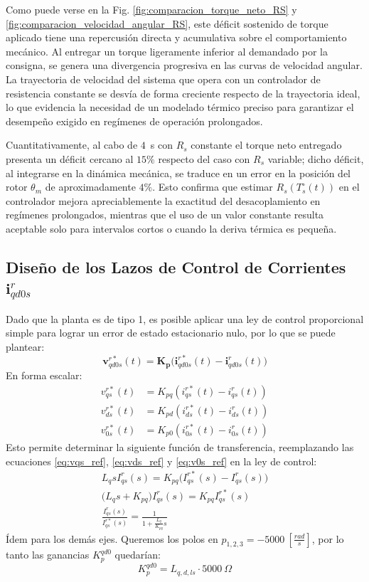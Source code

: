 \documentclass[12pt, a4paper,journal, onecolumn, compsoc]{IEEEtran}
\begin{document}
Como puede verse en la Fig. \ref{fig:comparacion_torque_neto_RS} y \ref{fig:comparacion_velocidad_angular_RS}, este déficit sostenido de torque aplicado tiene una repercusión directa y acumulativa sobre el comportamiento mecánico. Al entregar un torque ligeramente inferior al demandado por la consigna, se genera una divergencia progresiva en las curvas de velocidad angular. La trayectoria de velocidad del sistema que opera con un controlador de resistencia constante se desvía de forma creciente respecto de la trayectoria ideal, lo que evidencia la necesidad de un modelado térmico preciso para garantizar el desempeño exigido en regímenes de operación prolongados.

Cuantitativamente, al cabo de $4$~s con $R_s$ constante el torque neto entregado presenta un déficit cercano al $15\%$ respecto del caso con $R_s$ variable; dicho déficit, al integrarse en la dinámica mecánica, se traduce en un error en la posición del rotor $\theta_m$ de aproximadamente $4\%$. Esto confirma que estimar $R_s(T_s^\circ(t))$ en el controlador mejora apreciablemente la exactitud del desacoplamiento en regímenes prolongados, mientras que el uso de un valor constante resulta aceptable solo para intervalos cortos o cuando la deriva térmica es pequeña.
\subsection{Diseño de los Lazos de Control de Corrientes $\bm{i}_{qd0s}^r$}
Dado que la planta es de tipo 1, es posible aplicar una ley de control proporcional simple para lograr un error de estado estacionario nulo, por lo que se puede plantear:
\begin{equation}
    \bm{v}_{qd0s}^{r*}(t) = \bm{K_p} \big(\bm{i}_{qd0s}^{r*}(t)-\bm{i}_{qd0s}^{r}(t)\big)
\end{equation}
En forma escalar:
\begin{equation*}
\begin{aligned}
v_{qs}^{r*}(t) &= K_{pq} \left(i_{qs}^{r*}(t) - i_{qs}^{r}(t)\right) \\
v_{ds}^{r*}(t) &= K_{pd} \left(i_{ds}^{r*}(t) - i_{ds}^{r}(t)\right) \\
v_{0s}^{r*}(t) &= K_{p0} \left(i_{0s}^{r*}(t) - i_{0s}^{r}(t)\right)
\end{aligned}
\end{equation*}
Esto permite determinar la siguiente función de transferencia, reemplazando las ecuaciones \eqref{eq:vqs_ref}, \eqref{eq:vds_ref} y \eqref{eq:v0s_ref} en la ley de control:
\begin{gather*}
    L_qsI_{qs}^r(s) = K_{pq}\big(I_{qs}^{r*}(s)-I_{qs}^{r}(s)\big) \\ 
    \Big(L_qs+K_{pq}\Big)I_{qs}^r(s)=K_{pq}I_{qs}^{r*}(s) \\
    \frac{I_{qs}^r(s)}{I_{qs}^{r*}(s)} = \frac{1}{1+\frac{L_q}{K_{pq}}s}
\end{gather*}
Ídem para los demás ejes.
Queremos los polos en $p_{1,2,3} = -5000 \ [\frac{rad}{s}]$, por lo tanto las ganancias $K_{p}^{qd0}$ quedarían: \[K_{p}^{qd0}=L_{q,d,ls}\cdot 5000 \ \Omega\]
\end{document}
